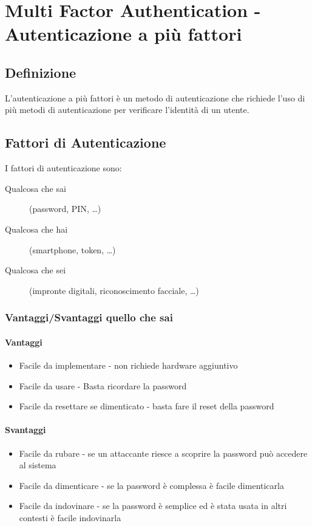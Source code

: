 \section{Multi Factor Authentication - Autenticazione a più fattori}
    \subsection{Definizione}
        L'autenticazione a più fattori è un metodo di autenticazione che richiede l'uso di più metodi di autenticazione per verificare l'identità di un utente.
    \subsection{Fattori di Autenticazione}
        I fattori di autenticazione sono:
        \begin{description}
            \item[Qualcosa che sai] (password, PIN, \dots)
            \item[Qualcosa che hai] (smartphone, token, \dots)
            \item[Qualcosa che sei] (impronte digitali, riconoscimento facciale, \dots)
        \end{description}
        \subsubsection{Vantaggi/Svantaggi quello che sai}
            \paragraph{Vantaggi}
                \begin{itemize}
                    \item Facile da implementare - non richiede hardware aggiuntivo
                    \item Facile da usare - Basta ricordare la password
                    \item Facile da resettare se dimenticato - basta fare il reset della password
                \end{itemize}
            \paragraph{Svantaggi}
                \begin{itemize}
                    \item Facile da rubare - se un attaccante riesce a scoprire la password può accedere al sistema 
                    \item Facile da dimenticare - se la password è complessa è facile dimenticarla
                    \item Facile da indovinare - se la password è semplice ed è stata usata in altri contesti è facile indovinarla
                \end{itemize}
